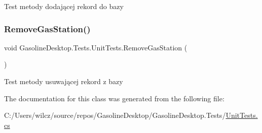 Test metody dodającej rekord do bazy 

\mbox{\label{class_gasoline_desktop_1_1_tests_1_1_unit_tests_a8efc68018ee08cddf8d64a007ca6c344}} 
\subsubsection{\texorpdfstring{RemoveGasStation()}{RemoveGasStation()}}
{\footnotesize\ttfamily void Gasoline\+Desktop.\+Tests.\+Unit\+Tests.\+Remove\+Gas\+Station (\begin{DoxyParamCaption}{ }\end{DoxyParamCaption})}



Test metody usuwającej rekord z bazy 



The documentation for this class was generated from the following file\+:\begin{DoxyCompactItemize}
\item 
C\+:/\+Users/wilcz/source/repos/\+Gasoline\+Desktop/\+Gasoline\+Desktop.\+Tests/\mbox{\hyperlink{_unit_tests_8cs}{Unit\+Tests.\+cs}}\end{DoxyCompactItemize}
